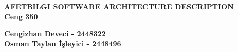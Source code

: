 \documentclass{scrreprt}
\begin{document}
\begin{center}
    {\bfseries
        \Huge{AFETBILGI SOFTWARE ARCHITECTURE DESCRIPTION}\\
        \vspace{1.6cm}
        Ceng 350\\
        \vspace{3.6cm}
    }
\end{center}

\begin{flushleft}
    {\bfseries
        \large{Cengizhan Deveci - 2448322}\\
        \vspace{0.25cm}
        \large{Osman Taylan İşleyici - 2448496}\\
    }
\end{flushleft}

\tableofcontents
\listoffigures
\listoftables






\end{document}
